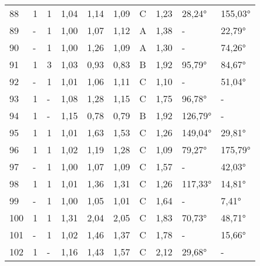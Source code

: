 \begin{longtable}{p{0.7cm}p{1.4cm}p{1.4cm}p{1cm}p{1cm}p{1cm}p{1cm}p{1cm}p{1cm}p{1cm}}
\small{88} & \small{1} & \small{1} & \small{1,04} & \small{1,14} & \small{1,09} & \small{C} & \small{1,23} & \small{28,24°} & \small{155,03°}\\
\small{89} & \small{-} & \small{1} & \small{1,00} & \small{1,07} & \small{1,12} & \small{A} & \small{1,38} & \small{-} & \small{22,79°}\\
\small{90} & \small{-} & \small{1} & \small{1,00} & \small{1,26} & \small{1,09} & \small{A} & \small{1,30} & \small{-} & \small{74,26°}\\
\small{91} & \small{1} & \small{3} & \small{1,03} & \small{0,93} & \small{0,83} & \small{B} & \small{1,92} & \small{95,79°} & \small{84,67°}\\
\small{92} & \small{-} & \small{1} & \small{1,01} & \small{1,06} & \small{1,11} & \small{C} & \small{1,10} & \small{-} & \small{51,04°}\\
\small{93} & \small{1} & \small{-} & \small{1,08} & \small{1,28} & \small{1,15} & \small{C} & \small{1,75} & \small{96,78°} & \small{-}\\
\small{94} & \small{1} & \small{-} & \small{1,15} & \small{0,78} & \small{0,79} & \small{B} & \small{1,92} & \small{126,79°} & \small{-}\\
\small{95} & \small{1} & \small{1} & \small{1,01} & \small{1,63} & \small{1,53} & \small{C} & \small{1,26} & \small{149,04°} & \small{29,81°}\\
\small{96} & \small{1} & \small{1} & \small{1,02} & \small{1,19} & \small{1,28} & \small{C} & \small{1,09} & \small{79,27°} & \small{175,79°}\\
\small{97} & \small{-} & \small{1} & \small{1,00} & \small{1,07} & \small{1,09} & \small{C} & \small{1,57} & \small{-} & \small{42,03°}\\
\small{98} & \small{1} & \small{1} & \small{1,01} & \small{1,36} & \small{1,31} & \small{C} & \small{1,26} & \small{117,33°} & \small{14,81°}\\
\small{99} & \small{-} & \small{1} & \small{1,00} & \small{1,05} & \small{1,01} & \small{C} & \small{1,64} & \small{-} & \small{7,41°}\\
\small{100} & \small{1} & \small{1} & \small{1,31} & \small{2,04} & \small{2,05} & \small{C} & \small{1,83} & \small{70,73°} & \small{48,71°}\\
\small{101} & \small{-} & \small{1} & \small{1,02} & \small{1,46} & \small{1,37} & \small{C} & \small{1,78} & \small{-} & \small{15,66°}\\
\small{102} & \small{1} & \small{-} & \small{1,16} & \small{1,43} & \small{1,57} & \small{C} & \small{2,12} & \small{29,68°} & \small{-}\\

\end{longtable}
